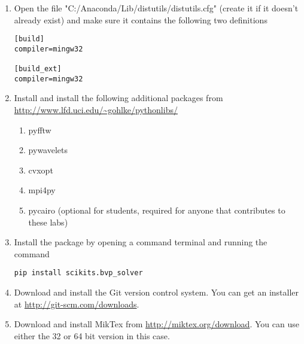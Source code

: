 \begin{enumerate}
\item Open the file "C:/Anaconda/Lib/distutils/distutils.cfg" (create it if it doesn't already exist) and make sure it contains the following two definitions
\begin{lstlisting}
[build]
compiler=mingw32

[build_ext]
compiler=mingw32
\end{lstlisting}

\item Install and install the following additional packages from \url{http://www.lfd.uci.edu/~gohlke/pythonlibs/}
\begin{enumerate}
	\item pyfftw
	\item pywavelets
	\item cvxopt
	\item mpi4py
	\item pycairo (optional for students, required for anyone that contributes to these labs)
\end{enumerate}

\item Install the  package by opening a command terminal and running the command
\begin{lstlisting}[style=ShellInput]
pip install scikits.bvp_solver
\end{lstlisting}

\item Download and install the Git version control system.
You can get an installer at \url{http://git-scm.com/downloads}.

\item Download and install MikTex from \url{http://miktex.org/download}.
You can use either the 32 or 64 bit version in this case.

\end{enumerate}

